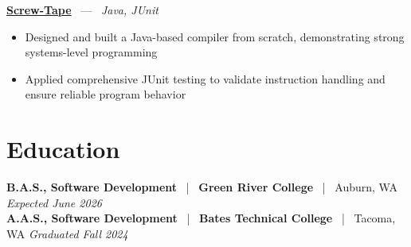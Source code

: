 \documentclass[10pt, letterpaper]{article}
\newcommand{\jobhead}[4]{%
  \vspace{5pt}%
  {\bfseries\color{dark}#1}%
  ~{\color{light}|}~%
  {\bfseries\color{navy}#2}%
  ~{\color{light}|}~%
  {\color{light}#3}%
  \hfill{\color{light}\small\textit{#4}}\\[-2pt]%
}
\newcommand{\projhead}[3]{%
  \vspace{5pt}%
  {\bfseries\color{dark}\href{#2}{#1}}%
  ~{\color{light}---}~%
  {\color{light}\small\textit{#3}}\\[-2pt]%
}
\begin{document}
\projhead{Screw-Tape}{https://github.com/timmyd4/screwtape}{Java, JUnit}
\begin{itemize}
  \item Designed and built a Java-based compiler from scratch, demonstrating strong systems-level programming
  \item Applied comprehensive JUnit testing to validate instruction handling and ensure reliable program behavior
\end{itemize}

\section{Education}

\jobhead{B.A.S., Software Development}{Green River College}{Auburn, WA}{Expected June 2026}
\jobhead{A.A.S., Software Development}{Bates Technical College}{Tacoma, WA}{Graduated Fall 2024}
\end{document}
